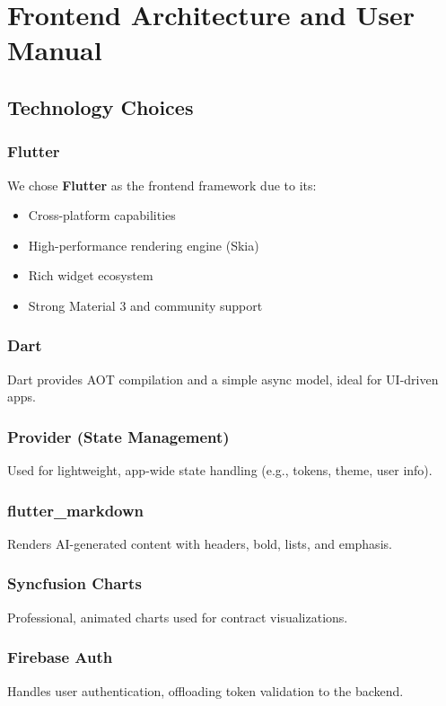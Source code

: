 \chapter{Frontend Architecture and User Manual}

\section{Technology Choices}
\subsection{Flutter}
We chose \textbf{Flutter} as the frontend framework due to its:
\begin{itemize}
    \item Cross-platform capabilities
    \item High-performance rendering engine (Skia)
    \item Rich widget ecosystem
    \item Strong Material 3 and community support
\end{itemize}

\subsection{Dart}
Dart provides AOT compilation and a simple async model, ideal for UI-driven apps.

\subsection{Provider (State Management)}
Used for lightweight, app-wide state handling (e.g., tokens, theme, user info).

\subsection{flutter\_markdown}
Renders AI-generated content with headers, bold, lists, and emphasis.

\subsection{Syncfusion Charts}
Professional, animated charts used for contract visualizations.

\subsection{Firebase Auth}
Handles user authentication, offloading token validation to the backend.

